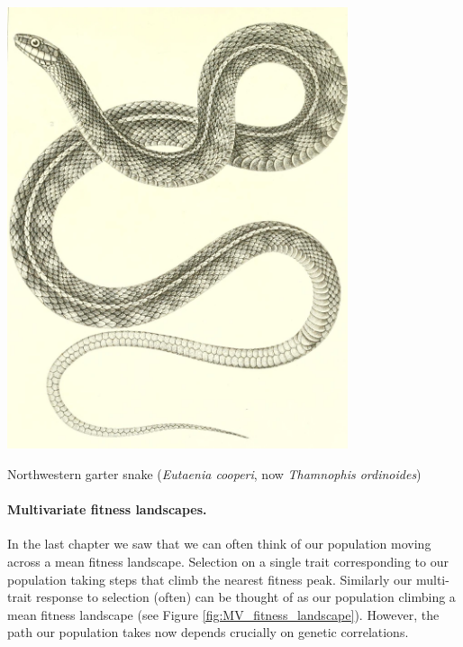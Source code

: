 \begin{marginfigure}
\begin{center} 
\includegraphics[width= 0.75\textwidth]{illustration_images/Quant_gen/Garter_snake/Eutaenia_cooperi.jpg}
\end{center}
\caption{Northwestern garter snake ({\it Eutaenia cooperi}, now {\it
    Thamnophis ordinoides})
 } \label{fig:Garter_snake}
\end{marginfigure} 


\paragraph{Multivariate fitness landscapes. }
In the last chapter we saw that we can often think of our population moving across a mean fitness landscape. Selection on a single trait corresponding to our population taking steps that climb the nearest fitness peak. Similarly our multi-trait response to selection (often) can be thought of as our population climbing a mean fitness landscape (see Figure \ref{fig:MV_fitness_landscape}). However, the path our population takes now depends crucially on genetic correlations.

